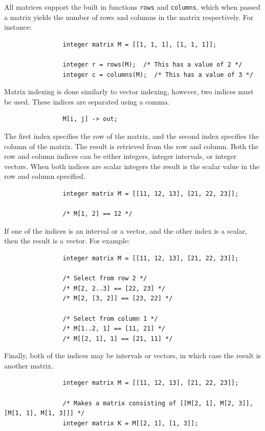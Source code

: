 \documentclass{article}
\begin{document}
			All matrices support the built in functions \texttt{rows} and \texttt{columns}, which when passed a matrix
			yields the number of rows and columns in the matrix respectively. For instance:

			\begin{lstlisting}
				integer matrix M = [[1, 1, 1], [1, 1, 1]];

				integer r = rows(M);  /* This has a value of 2 */
				integer c = columns(M);  /* This has a value of 3 */
			\end{lstlisting}

			Matrix indexing is done similarly to vector indexing, however, two indices must be used. These indices are
			separated using a comma.

			\begin{lstlisting}
				M[i, j] -> out;
			\end{lstlisting}

			The first index specifies the row of the matrix, and the second index specifies the column of the matrix.
			The result is retrieved from the row and column.  Both the row and column indices can be either integers,
			integer intervals, or integer vectors.  When both indices are scalar integers the result is the scalar value
			in the row and column specified.

			\begin{lstlisting}
				integer matrix M = [[11, 12, 13], [21, 22, 23]];

				/* M[1, 2] == 12 */
			\end{lstlisting}

			If one of the indices is an interval or a vector, and the other index is a scalar, then the result is a
			vector. For example:

			\begin{lstlisting}
				integer matrix M = [[11, 12, 13], [21, 22, 23]];

				/* Select from row 2 */
				/* M[2, 2..3] == [22, 23] */
				/* M[2, [3, 2]] == [23, 22] */

				/* Select from column 1 */
				/* M[1..2, 1] == [11, 21] */
				/* M[[2, 1], 1] == [21, 11] */
			\end{lstlisting}

			Finally, both of the indices may be intervals or vectors, in which case the result is another matrix.

			\begin{lstlisting}
				integer matrix M = [[11, 12, 13], [21, 22, 23]];

				/* Makes a matrix consisting of [[M[2, 1], M[2, 3]], [M[1, 1], M[1, 3]]] */
				integer matrix K = M[[2, 1], [1, 3]];
			\end{lstlisting}
\end{document}
